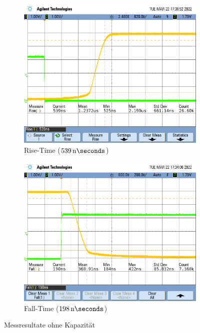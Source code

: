 \documentclass[../main.tex]{subfiles}
\begin{document}
\begin{figure}[h]
    \centering
    \begin{subfigure}[b]{0.45\textwidth}
        \centering
        \includegraphics[width=\textwidth]{assets/task3_square/SquareRise_0F.png}
        \caption{Rise-Time ($\SI{539}{\nano\seconds}$)}
        \label{fig:square_rise}
    \end{subfigure}
    \hfill
    \begin{subfigure}[b]{0.45\textwidth}
        \centering
        \includegraphics[width=\textwidth]{assets/task3_square/SquareFall_0F.png}
        \caption{Fall-Time ($\SI{198}{\nano\seconds}$)}
        \label{fig:square_fall}
    \end{subfigure}
    \caption{Messresultate ohne Kapazität}
    \label{fig:square_no_cap}
\end{figure}
\end{document}
